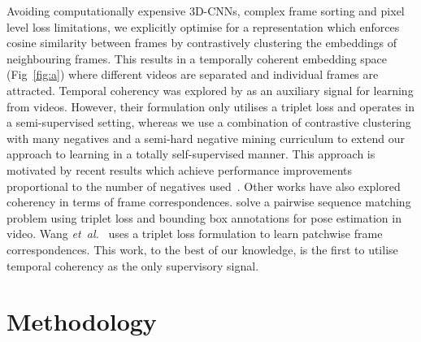 \documentclass[a4paper,conference]{IEEEtran}
\newcommand{\etal}{\emph{et~al.}}
\begin{document}
Avoiding computationally expensive 3D-CNNs, complex frame sorting and pixel level loss limitations, we explicitly optimise for a representation which enforces cosine similarity between frames by contrastively clustering the embeddings of neighbouring frames. This results in a temporally coherent embedding space (Fig~\ref{fig:a}) where different videos are separated and individual frames are attracted. 
Temporal coherency was explored by \cite{jayaraman2016slow} as an auxiliary signal for learning from videos. However, their formulation only utilises a triplet loss and operates in a semi-supervised setting, whereas we use a combination of contrastive clustering with many negatives and a semi-hard negative mining curriculum to extend our approach to learning in a totally self-supervised manner.
This approach is motivated by recent results which achieve performance improvements proportional to the number of negatives used~\cite{bachman2019learning,tian2019contrastive,tschannen2019mutual}.
Other works have also explored coherency in terms of frame correspondences. \cite{milbich2017unsupervised} solve a pairwise sequence matching problem using triplet loss and bounding box annotations for pose estimation in video. Wang \etal{}~\cite{wang2015unsupervised} uses a triplet loss formulation to learn patchwise frame correspondences. This work, to the best of our knowledge, is the first to utilise temporal coherency as the only supervisory signal.














































 \section{Methodology}
\end{document}
